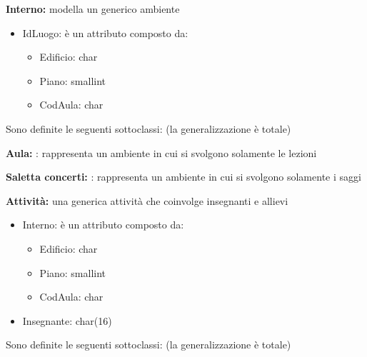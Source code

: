 \documentclass{article}
\begin{document}
\begin{flushleft}
\textbf{Interno: }modella un generico ambiente


\begin{itemize}
\item IdLuogo: è un attributo composto da:
	\begin{itemize}
	\item Edificio: char
	\item Piano: smallint
	\item CodAula: char
	\end{itemize}

\end{itemize}

\end{flushleft}



\begin{flushleft}
Sono definite le seguenti sottoclassi: (la generalizzazione è totale)
\end{flushleft}


\textbf{Aula: }: rappresenta un ambiente in cui si svolgono solamente le lezioni \medskip


\textbf{Saletta concerti: }: rappresenta un ambiente in cui si svolgono solamente i saggi

\medskip

\begin{flushleft}
\textbf{Attività: }una generica attività che coinvolge insegnanti e allievi

\begin{itemize}
\item Interno: è un attributo composto da:
	\begin{itemize}
	\item Edificio: char
	\item Piano: smallint
	\item CodAula: char
	\end{itemize}
\item Insegnante: char(16)
\end{itemize}

\end{flushleft}


\begin{flushleft}
Sono definite le seguenti sottoclassi: (la generalizzazione è totale)\\
\end{flushleft}
\end{document}
